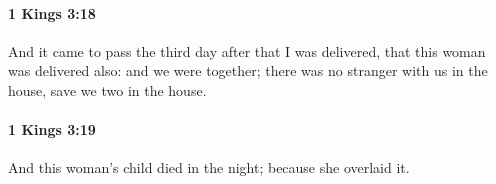 		\paragraph{1 Kings 3:18} %
			\label{1KINGS-3-18}

			And it came to pass the third day after that I was delivered, that this woman was delivered also: and we were together; there was no stranger with us in the house, save we two in the house.


		\paragraph{1 Kings 3:19} %
			\label{1KINGS-3-19}

			And this woman’s child died in the night; because she overlaid it.


